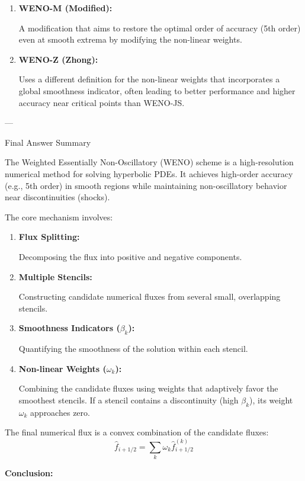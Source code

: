 \documentclass[10pt,a4paper]{article}
\begin{document}
\begin{description}
\begin{description}
\begin{enumerate}
The standard, widely used formulation described above.
\item \textbf{WENO-M (Modified):} 

A modification that aims to restore the optimal order of accuracy (5th order) even at smooth extrema by modifying the non-linear weights.
\item \textbf{WENO-Z (Zhong):} 

Uses a different definition for the non-linear weights that incorporates a global smoothness indicator, often leading to better performance and higher accuracy near critical points than WENO-JS.

\end{enumerate}

\end{description}
---

\item Final Answer Summary

The Weighted Essentially Non-Oscillatory (WENO) scheme is a high-resolution numerical method for solving hyperbolic PDEs. It achieves high-order accuracy (e.g., 5th order) in smooth regions while maintaining non-oscillatory behavior near discontinuities (shocks).

The core mechanism involves:
\begin{enumerate}

\item  \textbf{Flux Splitting: }

Decomposing the flux into positive and negative components.
\item \textbf{Multiple Stencils: }

Constructing candidate numerical fluxes from several small, overlapping stencils.
\item  \textbf{Smoothness Indicators ($\beta_k$): }

Quantifying the smoothness of the solution within each stencil.
\item \textbf{Non-linear Weights ($\omega_k$): }

Combining the candidate fluxes using weights that adaptively favor the smoothest stencils. If a stencil contains a discontinuity (high $\beta_k$), its weight $\omega_k$ approaches zero.

\end{enumerate}
The final numerical flux is a convex combination of the candidate fluxes:
$$\hat{f}_{i+1/2} = \sum_{k} \omega_k \hat{f}_{i+1/2}^{(k)}$$

\end{description}
\textbf{Conclusion:}
\end{document}
